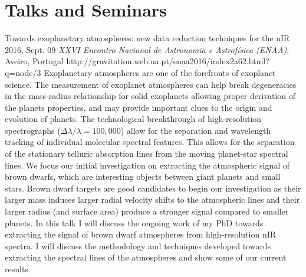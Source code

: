 \section{Talks and Seminars}	\label{app_sec:talks}

 {Towards exoplanetary atmospheres: new data reduction techniques for the nIR} %
{2016, Sept. 09}%
{\textit{XXVI Encontro Nacional de Astronomia e Astrofísica (ENAA)}, Aveiro, Portugal}%
{http://gravitation.web.ua.pt/enaa2016/index2a62.html?q=node/3}%
{}%
{Exoplanetary atmospheres are one of the forefronts of exoplanet science. The measurement of exoplanet atmospheres can help break degeneracies in the mass-radius relationship for solid exoplanets allowing proper derivation of the planets properties, and may provide important clues to the origin and evolution of planets. The technological breakthrough of high-resolution spectrographs ($\Delta \lambda / \lambda = 100,000$) allow for the separation and wavelength tracking of individual molecular spectral features. This allows for the separation of the stationary telluric absorption lines from the moving planet-star spectral lines. We focus our initial investigation on extracting the atmospheric signal of brown dwarfs, which are interesting objects between giant planets and small stars. Brown dwarf targets are good candidates to begin our investigation as their larger mass induces larger radial velocity shifts to the atmospheric lines and their larger radius (and surface area) produce a stronger signal compared to smaller planets.
    In this talk I will discuss the ongoing work of my PhD towards extracting the signal of brown dwarf atmospheres from high-resolution nIR spectra. I will discuss the methodology and techniques developed towards extracting the spectral lines of the atmospheres and show some of our current results.}%
